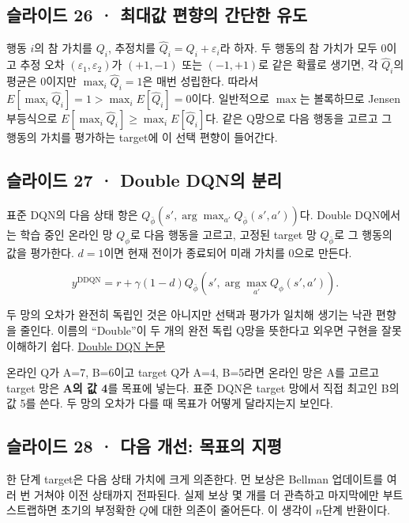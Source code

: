 \documentclass[11pt,a4paper]{article}
\begin{document}
\subsection{슬라이드 26 · 최대값 편향의 간단한 유도}

행동 $i$의 참 가치를 $Q_i$, 추정치를 $\widehat Q_i=Q_i+\varepsilon_i$라 하자. 두 행동의 참 가치가 모두 0이고 추정 오차 $(\varepsilon_1,\varepsilon_2)$가 $(+1,-1)$ 또는 $(-1,+1)$로 같은 확률로 생기면, 각 $\widehat Q_i$의 평균은 0이지만 $\max_i\widehat Q_i=1$은 매번 성립한다. 따라서 $E[\max_i\widehat Q_i]=1>\max_iE[\widehat Q_i]=0$이다. 일반적으로 $\max$는 볼록하므로 Jensen 부등식으로 $E[\max_i\widehat Q_i]\ge\max_iE[\widehat Q_i]$다. 같은 Q망으로 다음 행동을 고르고 그 행동의 가치를 평가하는 target에 이 선택 편향이 들어간다.\par

\subsection{슬라이드 27 · Double DQN의 분리}

표준 DQN의 다음 상태 항은 $Q_{\bar\phi}(s',\arg\max_{a'}Q_{\bar\phi}(s',a'))$다. Double DQN에서는 학습 중인 온라인 망 $Q_\phi$로 다음 행동을 고르고, 고정된 target 망 $Q_{\bar\phi}$로 그 행동의 값을 평가한다. $d=1$이면 현재 전이가 종료되어 미래 가치를 0으로 만든다.\par

\[
y^{\mathrm{DDQN}}=r+\gamma(1-d)
Q_{\bar\phi}\!\left(s',\arg\max_{a'}Q_\phi(s',a')\right).
\]

두 망의 오차가 완전히 독립인 것은 아니지만 선택과 평가가 일치해 생기는 낙관 편향을 줄인다. 이름의 “Double”이 두 개의 완전 독립 Q망을 뜻한다고 외우면 구현을 잘못 이해하기 쉽다. \href{https://arxiv.org/abs/1509.06461}{Double DQN 논문}\par

온라인 Q가 A=7, B=6이고 target Q가 A=4, B=5라면 온라인 망은 A를 고르고 target 망은 \textbf{A의 값 4}를 목표에 넣는다. 표준 DQN은 target 망에서 직접 최고인 B의 값 5를 쓴다. 두 망의 오차가 다를 때 목표가 어떻게 달라지는지 보인다.\par

\subsection{슬라이드 28 · 다음 개선: 목표의 지평}

한 단계 target은 다음 상태 가치에 크게 의존한다. 먼 보상은 Bellman 업데이트를 여러 번 거쳐야 이전 상태까지 전파된다. 실제 보상 몇 개를 더 관측하고 마지막에만 부트스트랩하면 초기의 부정확한 $Q$에 대한 의존이 줄어든다. 이 생각이 $n$단계 반환이다.\par
\end{document}
